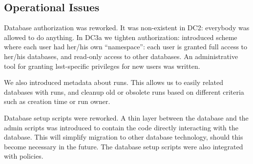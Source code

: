 
\subsection{Operational Issues}


Database authorization was reworked. It was non-existent in DC2:
everybody was allowed to do anything. In DC3a we tighten
authorization: introduced scheme where each user had her/his
own ``namespace'': each user is granted full access to
her/his databases, and read-only access to other databases.
An administrative tool for granting lsst-specific
privileges for new users was written.


We also introduced metadata about runs. This allows us
to easily related databases with runs, and cleanup old
or obsolete runs based on different criteria such as
creation time or run owner.


Database setup scripts were reworked. A thin layer between
the database and the admin scripts was introduced to contain
the code directly interacting with the database. This will
simplify migration to other database technology, should
this become necessary in the future. The database setup
scripts were also integrated with policies.




